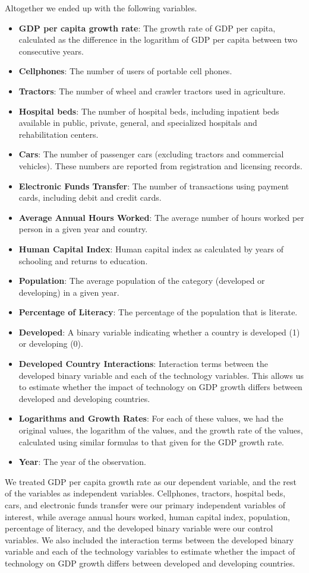 \documentclass[11pt]{texMemo}
\begin{document}
Altogether we ended up with the following variables.
\begin{itemize}
    \item \textbf{GDP per capita growth rate}: The growth rate of GDP per capita, calculated as the difference in the logarithm of GDP per capita between two consecutive years.
    \item \textbf{Cellphones}: The number of users of portable cell phones.
    \item \textbf{Tractors}: The number of wheel and crawler tractors used in agriculture.
    \item \textbf{Hospital beds}: The number of hospital beds, including inpatient beds available in public, private, general, and specialized hospitals and rehabilitation centers.
    \item \textbf{Cars}: The number of passenger cars (excluding tractors and commercial vehicles). These numbers are reported from registration and licensing records.
    \item \textbf{Electronic Funds Transfer}: The number of transactions using payment cards, including debit and credit cards.
    \item \textbf{Average Annual Hours Worked}: The average number of hours worked per person in a given year and country.
    \item \textbf{Human Capital Index}: Human capital index as calculated by years of schooling and returns to education.
    \item \textbf{Population}: The average population of the category (developed or developing) in a given year.
    \item \textbf{Percentage of Literacy}: The percentage of the population that is literate.
    \item \textbf{Developed}: A binary variable indicating whether a country is developed (1) or developing (0).
    \item \textbf{Developed Country Interactions}: Interaction terms between the developed binary variable and each of the technology variables. This allows us to estimate whether the impact of technology on GDP growth differs between developed and developing countries.
    \item \textbf{Logarithms and Growth Rates}: For each of these values, we had the original values, the logarithm of the values, and the growth rate of the values, calculated using similar formulas to that given for the GDP growth rate.
    \item \textbf{Year}: The year of the observation.
\end{itemize}
We treated GDP per capita growth rate as our dependent variable, and the rest of the variables as independent variables.
Cellphones, tractors, hospital beds, cars, and electronic funds transfer were our primary independent variables of interest, while average annual hours worked, human capital index, population, percentage of literacy, and the developed binary variable were our control variables.
We also included the interaction terms between the developed binary variable and each of the technology variables to estimate whether the impact of technology on GDP growth differs between developed and developing countries.
\end{document}
